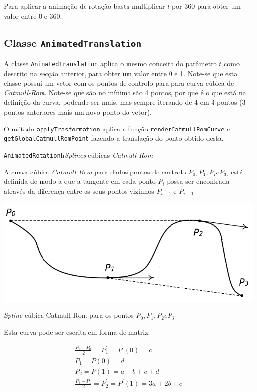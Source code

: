 Para aplicar a animação de rotação basta multiplicar $t$ por 360 para obter um
valor entre 0 e 360.


\subsection{Classe \texttt{AnimatedTranslation}}

A classe \texttt{AnimatedTranslation} aplica o mesmo conceito do parâmetro
$t$ como descrito na secção anterior, para obter um valor entre 0 e 1. Note-se
que esta classe possui um vetor com os pontos de controlo para para curva cúbica
de \emph{Catmull-Rom}. Note-se que são no mínimo são 4 pontos, por que é o que
está na definição da curva, podendo ser mais, mas sempre iterando de 4 em
4 pontos (3 pontos anteriores mais um novo ponto do vetor).

O método \texttt{applyTrasformation} aplica a função
\texttt{renderCatmullRomCurve} e \texttt{getGlobalCatmullRomPoint} fazendo
a translação do ponto obtido desta.   

\paragrap\texttt{AnimatedRotation}h{\emph{Splines} cúbicas \emph{Catmull-Rom}}

A curva cúbica \emph{Catmull-Rom} para dados pontos de controlo $P_{0}, P_{1},
P_{2} e P_{3}$, está definida de modo a que a tangente em cada ponto $P_{i}$
possa ser encontrada através da diferença entre os seus pontos vizinhos
$P_{i-1}$ e $P_{i+1}$

\begin{center}
 	
 	\includegraphics[scale=0.5,keepaspectratio]{resources/catmullDeriv.png}
 	\captionsetup{type=figure, width=0.8\linewidth}
	\caption{\emph{Spline} cúbica Catmull-Rom para os pontos $P_{0}, P_{1}, P_{2} e P_{3}$}
\label{fig:ssec1:diagram:plane:to:sphere} 
\end{center}

Esta curva pode ser escrita em forma de matriz:

\begin{gather*}
\frac{P_{2}-P_{0}}{2} = P_{1}^{'} = P^{'}(0) = c  \\
P_{1}                 = P(0)      = d        		  \\
P_{2}                 =P(1)       =a+b+c+d    		\\
\frac{P_{3}-P_{1}}{2} = P_{2}^{'} = P^{'}(1) = 3a+2b+c 
\end{gather*}


